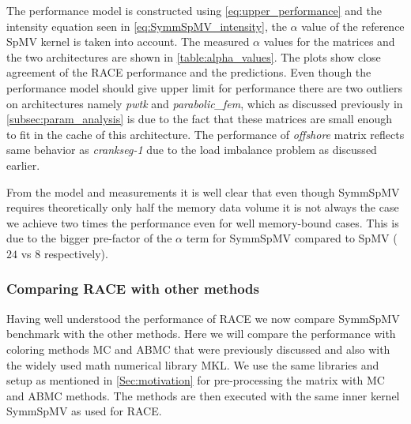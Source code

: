 The performance model is constructed using \cref{eq:upper_performance} and the intensity equation seen in \cref{eq:SymmSpMV_intensity}, the $\alpha$ value of the reference \acrshort{SpMV} kernel is taken into account. The measured $\alpha$ values for the matrices and the two architectures are shown in \cref{table:alpha_values}. The plots show close agreement of the \acrshort{RACE} performance and the predictions. Even though the performance model should give upper limit for performance there are two outliers on \SKX architectures namely \emph{pwtk} and \emph{parabolic\_fem}, which as discussed previously in \cref{subsec:param_analysis} is due to the fact that these matrices are small enough to fit in the cache of this architecture. The performance of \emph{offshore} matrix reflects same behavior as \emph{crankseg-1} due to the load imbalance problem as discussed earlier.


From the model and measurements it is well clear that even though \acrshort{SymmSpMV} requires theoretically only half the memory data volume it is not always the case we achieve two times the performance even for well memory-bound cases. This is due to the bigger pre-factor of the $\alpha$ term for \acrshort{SymmSpMV} compared to \acrshort{SpMV} ($24$ vs $8$ respectively).

%
\subsubsection{Comparing RACE with other methods}
%

Having well understood the performance of \acrshort{RACE} we now compare \acrshort{SymmSpMV} benchmark with the other methods. Here we will compare the performance with coloring methods \acrshort{MC} and \acrshort{ABMC} that were previously discussed and also with the widely used math numerical library \acrshort{MKL}.  We use the same libraries and setup as mentioned in  \cref{Sec:motivation} for pre-processing the matrix with \acrshort{MC} and \acrshort{ABMC} methods. The methods are then executed with the same inner kernel \acrshort{SymmSpMV} as used for \acrshort{RACE}.  

